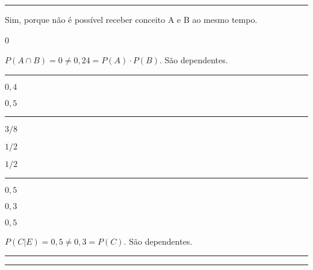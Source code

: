 \documentclass[a4paper,11pt,fleqn]{article}\usepackage[]{graphicx}\usepackage[]{color}
\theoremstyle{definition}
\begin{document}
\begin{compactenum}
\vspace{0.3cm}
\hrule
\vspace{0.3cm}

\item
  \begin{compactenum}
  \item Sim, porque não é possível receber conceito A e B ao mesmo
    tempo.
  \item 0
  \item $P(A \cap B) = 0 \neq 0,24 = P(A) \cdot P(B)$. São dependentes.
  \end{compactenum}

\vspace{0.3cm}
\hrule
\vspace{0.3cm}

\item
  \begin{inparaenum}
  \item $0,4$
  \item $0,5$
  \end{inparaenum}

\vspace{0.3cm}
\hrule
\vspace{0.3cm}

\item
  \begin{inparaenum}
  \item $3/8$
  \item $1/2$
  \item $1/2$
  \end{inparaenum}

\vspace{0.3cm}
\hrule
\vspace{0.3cm}

\item
  \begin{inparaenum}
  \item
  \item $0,5$
  \item $0,3$
  \item $0,5$
  \item $P(C|E) = 0,5 \neq 0,3 = P(C)$. São dependentes.
  \end{inparaenum}

\vspace{0.3cm}
\hrule
\vspace{0.3cm}

\clearpage

\vspace{0.3cm}
\hrule
\vspace{0.3cm}


\end{compactenum}
\end{document}
